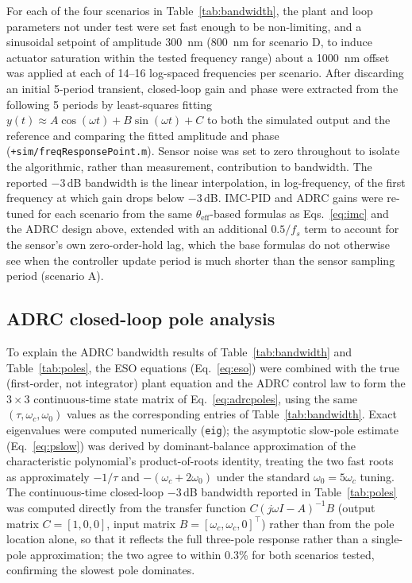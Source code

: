 \documentclass[fleqn,10pt]{wlscirep}
\begin{document}
For each of the four scenarios in Table~\ref{tab:bandwidth}, the plant and loop parameters not under test were set fast enough to be non-limiting, and a sinusoidal setpoint of amplitude \SI{300}{nm} (\SI{800}{nm} for scenario D, to induce actuator saturation within the tested frequency range) about a \SI{1000}{nm} offset was applied at each of 14--16 log-spaced frequencies per scenario. After discarding an initial 5-period transient, closed-loop gain and phase were extracted from the following 5 periods by least-squares fitting $y(t) \approx A\cos(\omega t) + B\sin(\omega t) + C$ to both the simulated output and the reference and comparing the fitted amplitude and phase (\texttt{+sim/freqResponsePoint.m}). Sensor noise was set to zero throughout to isolate the algorithmic, rather than measurement, contribution to bandwidth. The reported $-3$\,dB bandwidth is the linear interpolation, in log-frequency, of the first frequency at which gain drops below $-3$\,dB. IMC-PID and ADRC gains were re-tuned for each scenario from the same $\theta_\text{eff}$-based formulas as Eqs.~\ref{eq:imc} and the ADRC design above, extended with an additional $0.5/f_s$ term to account for the sensor's own zero-order-hold lag, which the base formulas do not otherwise see when the controller update period is much shorter than the sensor sampling period (scenario A).

\subsection*{ADRC closed-loop pole analysis}

To explain the ADRC bandwidth results of Table~\ref{tab:bandwidth} and Table~\ref{tab:poles}, the ESO equations (Eq.~\ref{eq:eso}) were combined with the true (first-order, not integrator) plant equation and the ADRC control law to form the $3\times3$ continuous-time state matrix of Eq.~\ref{eq:adrcpoles}, using the same $(\tau,\omega_c,\omega_0)$ values as the corresponding entries of Table~\ref{tab:bandwidth}. Exact eigenvalues were computed numerically (\texttt{eig}); the asymptotic slow-pole estimate (Eq.~\ref{eq:pslow}) was derived by dominant-balance approximation of the characteristic polynomial's product-of-roots identity, treating the two fast roots as approximately $-1/\tau$ and $-(\omega_c+2\omega_0)$ under the standard $\omega_0=5\omega_c$ tuning. The continuous-time closed-loop $-3$\,dB bandwidth reported in Table~\ref{tab:poles} was computed directly from the transfer function $C(j\omega I - A)^{-1}B$ (output matrix $C=[1,0,0]$, input matrix $B=[\omega_c,\omega_c,0]^\top$) rather than from the pole location alone, so that it reflects the full three-pole response rather than a single-pole approximation; the two agree to within 0.3\% for both scenarios tested, confirming the slowest pole dominates.
\end{document}
